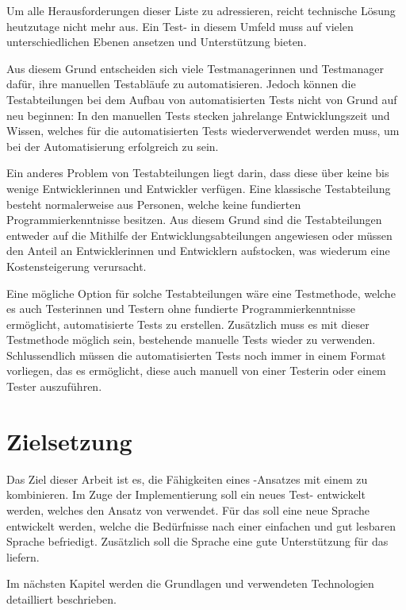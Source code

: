 \SuperPar
Um alle Herausforderungen dieser Liste zu adressieren, reicht  technische Lösung heutzutage nicht mehr aus. Ein Test- in diesem Umfeld muss auf vielen unterschiedlichen Ebenen ansetzen und Unterstützung bieten. 

\SuperPar
Aus diesem Grund entscheiden sich viele Testmanagerinnen und Testmanager dafür, ihre manuellen Testabläufe zu automatisieren. Jedoch können die Testabteilungen bei dem Aufbau von automatisierten Tests nicht von Grund auf neu beginnen: In den manuellen Tests stecken jahrelange Entwicklungszeit und Wissen, welches für die automatisierten Tests wiederverwendet werden muss, um bei der Automatisierung erfolgreich zu sein. 

\SuperPar
Ein anderes Problem von Testabteilungen liegt darin, dass diese über keine bis wenige Entwicklerinnen und Entwickler verfügen. Eine klassische Testabteilung besteht normalerweise aus Personen, welche keine fundierten Programmierkenntnisse besitzen. Aus diesem Grund sind die Testabteilungen entweder auf die Mithilfe der Entwicklungsabteilungen angewiesen oder müssen den Anteil an Entwicklerinnen und Entwicklern aufstocken, was wiederum eine Kostensteigerung verursacht.

\SuperPar
Eine mögliche Option für solche Testabteilungen wäre eine Testmethode, welche es auch Testerinnen und Testern ohne fundierte Programmierkenntnisse ermöglicht, automatisierte Tests zu erstellen. Zusätzlich muss es mit dieser Testmethode möglich sein, bestehende manuelle Tests wieder zu verwenden. Schlussendlich müssen die automatisierten Tests noch immer in einem Format vorliegen, das es ermöglicht, diese auch manuell von einer Testerin oder einem Tester auszuführen.


\section{Zielsetzung}

Das Ziel dieser Arbeit ist es, die Fähigkeiten eines -Ansatzes mit einem   zu kombinieren. Im Zuge der Implementierung soll ein neues Test- entwickelt werden, welches den Ansatz von  verwendet. Für das  soll eine neue Sprache entwickelt werden, welche die Bedürfnisse nach einer einfachen und gut lesbaren Sprache befriedigt. Zusätzlich soll die Sprache eine gute Unterstützung für das  liefern.

\SuperPar
Im nächsten Kapitel werden die Grundlagen und verwendeten Technologien detailliert beschrieben.